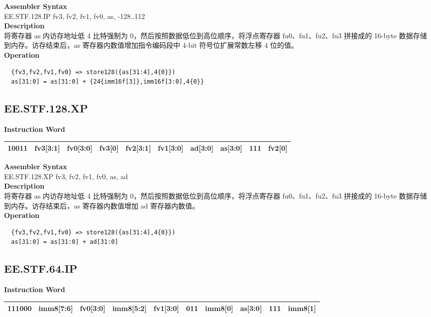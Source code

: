 \textbf{Assembler Syntax} \\
EE.STF.128.IP fv3, fv2, fv1, fv0, as, -128..112 \\
\textbf{Description} \\
将寄存器 as 内访存地址低 4 比特强制为 0，然后按照数据低位到高位顺序，将浮点寄存器 fu0、fu1、fu2、fu3 拼接成的 16-byte 数据存储到内存。访存结束后，as 寄存器内数值增加指令编码段中 4-bit 符号位扩展常数左移 4 位的值。\\
\textbf{Operation}
\begin{lstlisting}
  {fv3,fv2,fv1,fv0} => store128({as[31:4],4{0}})
  as[31:0] = as[31:0] + {24{imm16f[3]},imm16f[3:0],4{0}}
\end{lstlisting}

\clearpage
\subsection{EE.STF.128.XP}\label{instruction:EESTF128XP}
\setlength\tabcolsep{6pt}
\textbf{Instruction Word} \\
\begin{tabular}{|c|c|c|c|c|c|c|c|c|c|}
	\hline
	10011 & fv3[3:1] & fv0[3:0] & fv3[0] & fv2[3:1] & fv1[3:0] & ad[3:0] & as[3:0] & 111 & fv2[0] \\
	\hline
\end{tabular}

\textbf{Assembler Syntax} \\
EE.STF.128.XP fv3, fv2, fv1, fv0, as, ad \\
\textbf{Description} \\
将寄存器 as 内访存地址低 4 比特强制为 0，然后按照数据低位到高位顺序，将浮点寄存器 fu0、fu1、fu2、fu3 拼接成的 16-byte 数据存储到内存。访存结束后，as 寄存器内数值增加 ad 寄存器内数值。\\
\textbf{Operation}
\begin{lstlisting}
  {fv3,fv2,fv1,fv0} => store128({as[31:4],4{0}})
  as[31:0] = as[31:0] + ad[31:0]
\end{lstlisting}

\clearpage
\subsection{EE.STF.64.IP}\label{instruction:EESTF64IP}
\setlength\tabcolsep{6pt}
\textbf{Instruction Word} \\
\begin{tabular}{|c|c|c|c|c|c|c|c|c|c|}
	\hline
	111000 & imm8[7:6] & fv0[3:0] & imm8[5:2] & fv1[3:0] & 011 & imm8[0] & as[3:0] & 111 & imm8[1] \\
	\hline
\end{tabular}

